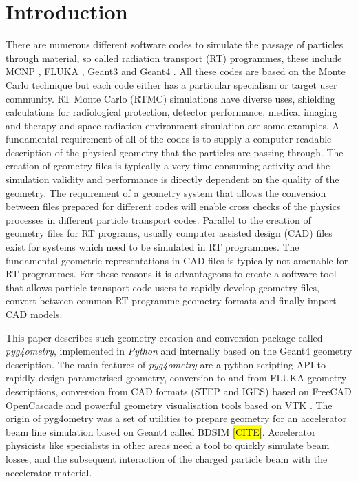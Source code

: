 \documentclass[final,5p,times,twocolumn]{elsarticle}
\begin{document}
\section{Introduction} \label{sec:introduction}
There are numerous different software codes to simulate the passage of particles through material, so called radiation transport (RT) programmes, these 
include MCNP \cite{Mcnp_Werner}, FLUKA \cite{Fluka_Ferrari,Fluka_Bohlen}, Geant3 \cite{Geant3_Brun} and Geant4 \cite{Geant4_Agostinelli}. 
All these codes are based on the Monte Carlo technique but each code either has a particular specialism or target user community.  RT Monte Carlo (RTMC) simulations 
have diverse uses, shielding calculations for radiological protection, detector performance, medical imaging and therapy and space radiation environment 
simulation are some examples. A fundamental requirement of all of the codes is to supply a computer readable description of the physical geometry that 
the particles are passing through.  The creation of geometry files is typically a very time consuming activity and the simulation validity and performance is directly 
dependent on the quality of the geometry. The requirement of a geometry system that allows the conversion between files prepared for different codes will 
enable cross checks of the physics processes in different particle transport codes. Parallel to the creation of geometry files for RT programs, usually computer assisted 
design (CAD) files exist for systems which need to be simulated in RT programmes. The fundamental geometric representations in CAD files is typically not 
amenable for RT programmes.  For these reasons it is advantageous to create a software tool that allows particle transport code users to rapidly develop 
geometry files, convert between common RT programme geometry formats and finally import CAD models. 

This paper describes such geometry creation and conversion package called {\em pyg4ometry}, implemented in {\em Python} and internally based on the Geant4 geometry 
description. The main features of  {\em pyg4ometry} are a python scripting API to rapidly design parametrised geometry, conversion to and from  FLUKA geometry 
descriptions, conversion from CAD formats  (STEP and IGES) based on FreeCAD \cite{FreeCAD} OpenCascade \cite{OpenCASCADE} and powerful geometry 
visualisation tools based on VTK \cite{VTK4}. The origin of pyg4ometry was a set of utilities to prepare geometry for an accelerator beam line simulation based on Geant4 
called BDSIM \colorbox{yellow}{[CITE]}. Accelerator physicists like specialists in other areas need a tool to quickly simulate beam losses, and the subsequent interaction of the charged particle 
beam with the accelerator material.
\end{document}
